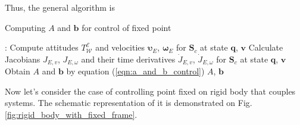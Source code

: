 Thus, the general algorithm is

\begin{breakablealgorithm}
    \caption{Computing $A$ and $\mathbf{b}$ for control of fixed point}

    \begin{algorithmic}[1]
         : 
        \State Compute attitudes $T_{\mathcal{W}}^{\mathcal{E}}$ and 
        velocities $\boldsymbol{\upsilon}_E$, $\boldsymbol{\omega}_E$ 
        for $\mathbf{S}_c$ at state $\mathbf{q}$, $\mathbf{v}$
        \State Calculate Jacobians $J_{E,v}$, $J_{E, \omega}$ and 
        their time derivatives $\dot{J}_{E,v}$, $\dot{J}_{E, \omega}$ 
        for $\mathbf{S}_c$ at state $\mathbf{q}$, $\mathbf{v}$
        \State Obtain $A$ and $\mathbf{b}$ by equation 
        (\ref{eqn:a_and_b_control})
        \State \Return $A$, $\mathbf{b}$
        \EndFunction
    \end{algorithmic}
    \label{alg:get_a_and_b_control_fixed}
\end{breakablealgorithm}

Now let's consider the case of controlling point fixed on rigid body that couples 
systems. The schematic representation of it is demonstrated on Fig. 
\ref{fig:rigid_body_with_fixed_frame}.

